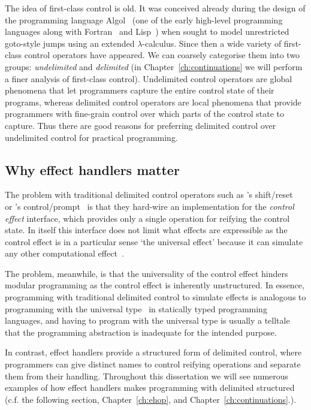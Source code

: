 \documentclass[12pt,phd,lfcs,twoside,openright,logo,leftchapter,normalheadings]{infthesis}
\theoremstyle{plain}
\theoremstyle{definition}
\begin{document}
The idea of first-class control is old. It was conceived already
during the design of the programming language
Algol~\cite{BackusBGKMPRSVWWW60} (one of the early high-level
programming languages along with Fortran~\cite{BackusBBGHHNSSS57} and
Lisp~\cite{McCarthy60}) when \citet{Landin98} sought to model
unrestricted goto-style jumps using an extended $\lambda$-calculus.
%
Since then a wide variety of first-class control operators have
appeared. We can coarsely categorise them into two groups:
\emph{undelimited} and \emph{delimited} (in
Chapter~\ref{ch:continuations} we will perform a finer analysis of
first-class control). Undelimited control operators are global
phenomena that let programmers capture the entire control state of
their programs, whereas delimited control operators are local
phenomena that provide programmers with fine-grain control over which
parts of the control state to capture.
%
Thus there are good reasons for preferring delimited control over
undelimited control for practical programming.

\subsection{Why effect handlers matter}
%
The problem with traditional delimited control operators such as
\citeauthor{DanvyF90}'s shift/reset~\cite{DanvyF90} or
\citeauthor{Felleisen88}'s control/prompt~\cite{Felleisen88} is that
they hard-wire an implementation for the \emph{control effect}
interface, which provides only a single operation for reifying the
control state. In itself this interface does not limit what effects
are expressible as the control effect is in a particular sense `the
universal effect' because it can simulate any other computational
effect~\cite{Filinski96}.

The problem, meanwhile, is that the universality of the control effect
hinders modular programming as the control effect is inherently
unstructured. In essence, programming with traditional delimited
control to simulate effects is analogous to programming with the
universal type~\cite{Longley03} in statically typed programming
languages, and having to program with the universal type is usually a
telltale that the programming abstraction is inadequate for the
intended purpose.

In contrast, effect handlers provide a structured form of delimited
control, where programmers can give distinct names to control reifying
operations and separate them from their handling. Throughout this
dissertation we will see numerous examples of how effect handlers
makes programming with delimited structured (c.f. the following
section, Chapter~\ref{ch:ehop}, and Chapter~\ref{ch:continuations}.).
%
\end{document}
